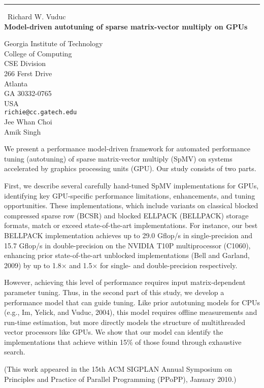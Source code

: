 \documentclass{report}
\begin{document}
\begin{center}
\rule{6in}{1pt} \
{\large Richard W. Vuduc \\
{\bf Model-driven autotuning of sparse matrix-vector multiply on GPUs}}

Georgia Institute of Technology \\ College of Computing \\ CSE Division \\ 266 Ferst Drive \\ Atlanta \\ GA 30332-0765 \\ USA
\\
{\tt richie@cc.gatech.edu}\\
Jee Whan Choi\\
Amik Singh\end{center}

We present a performance model-driven framework for automated
performance tuning (autotuning) of sparse matrix-vector multiply
(SpMV) on systems accelerated by graphics processing units (GPU). Our
study consists of two parts.

First, we describe several carefully hand-tuned SpMV implementations
for GPUs, identifying key GPU-specific performance limitations,
enhancements, and tuning opportunities. These implementations, which
include variants on classical blocked compressed sparse row (BCSR) and
blocked ELLPACK (BELLPACK) storage formats, match or exceed
state-of-the-art implementations. For instance, our best BELLPACK
implementation achieves up to 29.0 Gflop/s in single-precision and 15.7
Gflop/s in double-precision on the NVIDIA T10P multiprocessor (C1060),
enhancing prior state-of-the-art unblocked implementations (Bell and Garland, 2009)
by up to 1.8$\times$ and 1.5$\times$ for single- and double-precision respectively.

However, achieving this level of performance requires input
matrix-dependent parameter tuning. Thus, in the second part of this
study, we develop a performance model that can guide tuning. Like
prior autotuning models for CPUs (e.g., Im, Yelick, and Vuduc, 2004),
this model requires offline measurements and run-time estimation, but
more directly models the structure of multithreaded vector processors
like GPUs. We show that our model can identify the implementations
that achieve within 15\% of those found through exhaustive search.

(This work appeared in the 15th ACM SIGPLAN Annual Symposium on
Principles and Practice of Parallel Programming (PPoPP), January 2010.)
\end{document}
